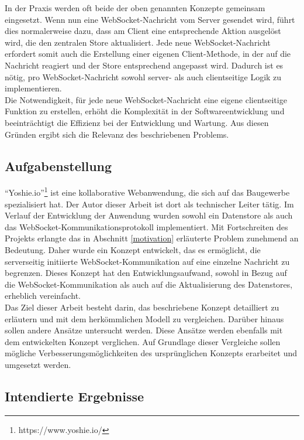 \documentclass[12pt]{article} %
\begin{document}
In der Praxis werden oft beide der oben genannten Konzepte gemeinsam eingesetzt. Wenn nun eine WebSocket-Nachricht vom Server gesendet wird, führt dies normalerweise dazu, dass am Client eine entsprechende Aktion ausgelöst wird, die den zentralen Store aktualisiert. Jede neue WebSocket-Nachricht erfordert somit auch die Erstellung einer eigenen Client-Methode, in der auf die Nachricht reagiert und der Store entsprechend angepasst wird. Dadurch ist es nötig, pro WebSocket-Nachricht sowohl server- als auch clientseitige Logik zu implementieren.
\\

Die Notwendigkeit, für jede neue WebSocket-Nachricht eine eigene clientseitige Funktion zu erstellen, erhöht die Komplexität in der Softwareentwicklung und beeinträchtigt die Effizienz bei der Entwicklung und Wartung. Aus diesen Gründen ergibt sich die Relevanz des beschriebenen Problems.

\subsection{Aufgabenstellung}
\label{jobdefinition}

"`Yoshie.io"'\footnote{https://www.yoshie.io/} ist eine kollaborative Webanwendung, die sich auf das Baugewerbe spezialisiert hat. Der Autor dieser Arbeit ist dort als technischer Leiter tätig. Im Verlauf der Entwicklung der Anwendung wurden sowohl ein Datenstore als auch das WebSocket-Kommunikationsprotokoll implementiert. Mit Fortschreiten des Projekts erlangte das in Abschnitt \ref{motivation} erläuterte Problem zunehmend an Bedeutung. Daher wurde ein Konzept entwickelt, das es ermöglicht, die serverseitig initiierte WebSocket-Kommunikation auf eine einzelne Nachricht zu begrenzen. Dieses Konzept hat den Entwicklungsaufwand, sowohl in Bezug auf die WebSocket-Kommunikation als auch auf die Aktualisierung des Datenstores, erheblich vereinfacht. \\

Das Ziel dieser Arbeit besteht darin, das beschriebene Konzept detailliert zu erläutern und mit dem herkömmlichen Modell zu vergleichen. Darüber hinaus sollen andere Ansätze untersucht werden. Diese Ansätze werden ebenfalls mit dem entwickelten Konzept verglichen. Auf Grundlage dieser Vergleiche sollen mögliche Verbesserungsmöglichkeiten des ursprünglichen Konzepts erarbeitet und umgesetzt werden.

\subsection{Intendierte Ergebnisse}
\label{results}
\end{document}
